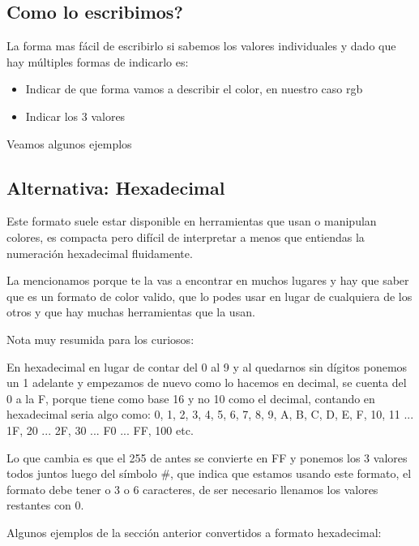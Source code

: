 \documentclass[letterpaper,10pt,spanish]{sphinxmanual}
\begin{document}
\subsection{Como lo escribimos?}
\label{\detokenize{colores:como-lo-escribimos}}
La forma mas fácil de escribirlo si sabemos los valores individuales y dado
que hay múltiples formas de indicarlo es:
\begin{itemize}
\item {} 
Indicar de que forma vamos a describir el color, en nuestro caso rgb

\item {} 
Indicar los 3 valores

\end{itemize}

Veamos algunos ejemplos




\subsection{Alternativa: Hexadecimal}
\label{\detokenize{colores:alternativa-hexadecimal}}
Este formato suele estar disponible en herramientas que usan o manipulan
colores, es compacta pero difícil de interpretar a menos que entiendas la
numeración hexadecimal fluidamente.

La mencionamos porque te la vas a encontrar en muchos lugares y hay que saber
que es un formato de color valido, que lo podes usar en lugar de cualquiera de
los otros y que hay muchas herramientas que la usan.

Nota muy resumida para los curiosos:

En hexadecimal en lugar de contar del 0 al 9 y al quedarnos sin dígitos ponemos
un 1 adelante y empezamos de nuevo como lo hacemos en decimal, se cuenta del 0
a la F, porque tiene como base 16 y no 10 como el decimal, contando en
hexadecimal seria algo como: 0, 1, 2, 3, 4, 5, 6, 7, 8, 9, A, B, C, D, E, F,
10, 11 ... 1F, 20 ... 2F, 30 ... F0 ... FF, 100 etc.

Lo que cambia es que el 255 de antes se convierte en FF y ponemos los 3 valores
todos juntos luego del símbolo \#, que indica que estamos usando este formato,
el formato debe tener o 3 o 6 caracteres, de ser necesario llenamos los valores
restantes con 0.

Algunos ejemplos de la sección anterior convertidos a formato hexadecimal:
\end{document}
